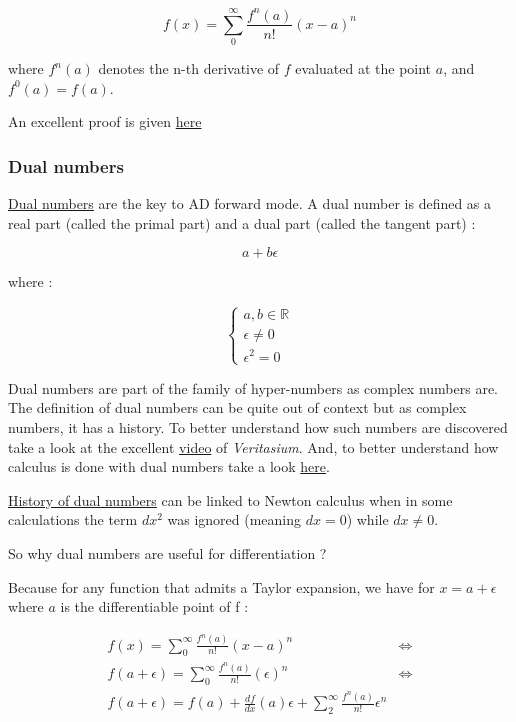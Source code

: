 \documentclass[12pt]{article}
\begin{document}
$$
f(x) = \sum_0^\infty  \frac{f^n(a)}{n!} (x-a)^n 
$$

where $f^n(a)$ denotes the n-th derivative of $f$ evaluated at the point $a$, and $f^0(a)=f(a)$.

An excellent proof is given \href{https://math.stackexchange.com/a/3261420/998679}{here}

\subsubsection{Dual numbers}


\href{https://en.wikipedia.org/wiki/Dual_number}{Dual numbers} are the key to AD forward mode. A dual number is defined as a real part (called the primal part) and a dual part (called the tangent part) : 

$$
a + b\epsilon
$$

where :

$$
\begin{cases}
a,b \in \mathbb{R} \\
\epsilon \neq 0 \\
\epsilon^2 = 0
\end{cases}
$$


Dual numbers are part of the family of hyper-numbers as complex numbers are.
The definition of dual numbers can be quite out of context but as complex numbers, it has a history. To better understand how such numbers are discovered take a look at the excellent \href{https://www.youtube.com/watch?v=cUzklzVXJwo&ab_channel=Veritasium}{video} of {\it Veritasium}. And, to better understand how calculus is done with dual numbers take a look \href{https://www.youtube.com/watch?v=ceaNqdHdqtg&t=319s&ab_channel=MichaelPenn}{here}.

\href{https://math.stackexchange.com/questions/341535/is-the-theory-of-dual-numbers-strong-enough-to-develop-real-analysis-and-does-i}{History of dual numbers} can be linked to Newton calculus when in some calculations the term $dx^2$ was ignored (meaning $dx=0$) while $dx \neq 0$. 

So why dual numbers are useful for differentiation ?

Because for any function that admits a Taylor expansion, we have for $x=a+\epsilon$ where $a$ is the differentiable point of f :

\begin{equation*}
    \begin{split}
        f(x) = \sum_0^\infty  \frac{f^n(a)}{n!} (x-a)^n  &\Leftrightarrow \\
        f(a+\epsilon) = \sum_0^\infty  \frac{f^n(a)}{n!} (\epsilon)^n &\Leftrightarrow \\
        f(a+\epsilon) = f(a) + \frac{df}{dx}(a) \epsilon + \sum_2^\infty  \frac{f^n(a)}{n!} \epsilon^n
    \end{split}
\end{equation*}
\end{document}

